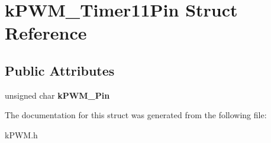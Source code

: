 \hypertarget{structkPWM__Timer11Pin}{}\section{k\+P\+W\+M\+\_\+\+Timer11\+Pin Struct Reference}
\label{structkPWM__Timer11Pin}
\subsection*{Public Attributes}
\begin{DoxyCompactItemize}
\item 
unsigned char {\bfseries k\+P\+W\+M\+\_\+\+Pin}\hypertarget{structkPWM__Timer11Pin_aeeaf25f1b736edaa7784976ec1ec3b29}{}\label{structkPWM__Timer11Pin_aeeaf25f1b736edaa7784976ec1ec3b29}

\end{DoxyCompactItemize}


The documentation for this struct was generated from the following file\+:\begin{DoxyCompactItemize}
\item 
k\+P\+W\+M.\+h\end{DoxyCompactItemize}
